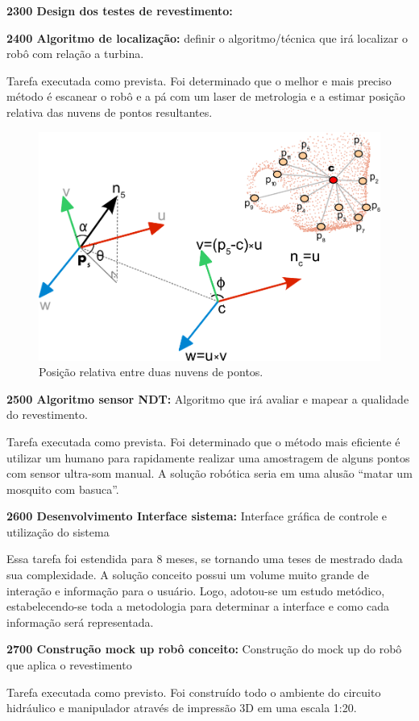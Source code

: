 \noindent
\textbf{2300 Design dos testes de revestimento:} %

\noindent
\textbf{2400 Algoritmo de localização:} definir o algoritmo/técnica que irá
localizar o robô com relação a turbina.

Tarefa executada como prevista. Foi determinado que o melhor e mais preciso
método é escanear o robô e a pá com um laser de metrologia e a estimar posição
relativa das nuvens de pontos resultantes.

\begin{figure}[H]
\centering
\includegraphics[width=0.6\columnwidth]{figs/pc_position}
\caption{Posição relativa entre duas nuvens de pontos.}
\end{figure} 

\noindent
\textbf{2500 Algoritmo sensor NDT:} Algoritmo que irá avaliar e mapear a
qualidade do revestimento.

Tarefa executada como prevista. Foi determinado que o método mais eficiente é
utilizar um humano para rapidamente realizar uma amostragem de alguns pontos com
sensor ultra-som manual. A solução robótica seria em uma alusão “matar um mosquito com basuca”.

\noindent
\textbf{2600 Desenvolvimento Interface sistema:} Interface gráfica de controle e
utilização do sistema

Essa tarefa foi estendida para 8 meses, se tornando uma teses de mestrado dada
sua complexidade. A solução conceito possui um volume muito grande de interação
e informação para o usuário. Logo, adotou-se um estudo metódico,
estabelecendo-se toda a metodologia para determinar a interface e como cada
informação será representada.

\noindent
\textbf{2700 Construção mock up robô conceito:} Construção do mock up do robô
que aplica o revestimento

Tarefa executada como previsto. Foi construído todo o ambiente do circuito
hidráulico e manipulador através de impressão 3D em uma escala 1:20.


